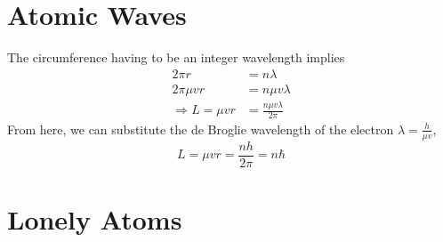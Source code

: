 \documentclass{article}
\begin{document}
\section{Atomic Waves}

The circumference having to be an integer wavelength implies
\begin{align}
    2 \pi r &= n \lambda \\
    2 \pi \mu v r &= n \mu v \lambda \\
    \Rightarrow L = \mu v r &= \frac{n \mu v \lambda}{2 \pi}
\end{align}
From here, we can substitute the de Broglie wavelength of the electron \(\lambda = \frac{h}{\mu v}\),
\begin{equation}
    L = \mu v r = \frac{n h}{2 \pi} = n \hbar
\end{equation}

\section{Lonely Atoms}

\subsection{}
\end{document}

